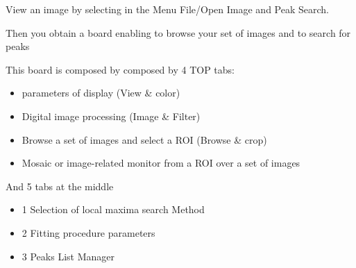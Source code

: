 \documentclass[letterpaper,10pt,english]{sphinxmanual}
\begin{document}
\noindent{}

View an image by selecting in the Menu  File/Open Image and Peak Search.

\noindent{}

Then you obtain a board enabling to browse your set of images and to search for peaks

\noindent{}

This board is composed by composed by 4 TOP tabs:
\begin{itemize}
\item {} 
parameters of display (View \& color)

\item {} 
Digital image processing (Image \& Filter)

\item {} 
Browse a set of images and select a ROI (Browse \& crop)

\item {} 
Mosaic or image-related monitor from a ROI over a set of images

\end{itemize}

And 5 tabs at the middle
\begin{itemize}
\item {} 
1 Selection of local maxima search Method

\item {} 
2 Fitting procedure parameters

\item {} 
3 Peaks List Manager

\end{itemize}
\end{document}
